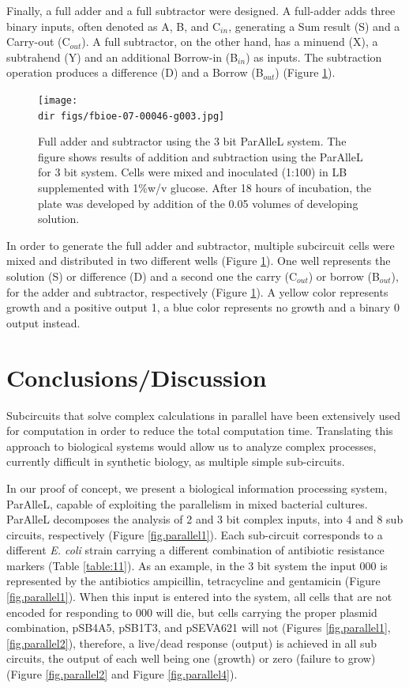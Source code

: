 Finally, a full adder and a full subtractor were designed. A full-adder adds three binary inputs, often denoted as A, B, and C$_{in}$, generating a Sum result (S) and a Carry-out (C$_{out}$). A full subtractor, on the other hand, has a minuend (X), a subtrahend (Y) and an additional Borrow-in (B$_{in}$) as inputs. The subtraction operation produces a difference (D) and a Borrow (B$_{out}$) (Figure \ref{fig.parallel3}).
\begin{figure}[htbp]
  \centering
  \texttt{[image: \\dir figs/fbioe-07-00046-g003.jpg]}
  \caption{Full adder and subtractor using the 3 bit ParAlleL system. The figure shows results of addition and subtraction using the ParAlleL for 3 bit system. Cells were mixed and inoculated (1:100) in LB supplemented with 1\%w/v glucose. After 18 hours of incubation, the plate was developed by addition of the 0.05 volumes of developing solution.}
  \label{fig.parallel3}
\end{figure}

In order to generate the full adder and subtractor, multiple subcircuit cells were mixed and distributed in two different wells (Figure \ref{fig.parallel3}). One well represents the solution (S) or difference (D) and a second one the carry (C$_{out}$) or borrow (B$_{out}$), for the adder and subtractor, respectively (Figure \ref{fig.parallel3}). A yellow color represents growth and a positive output 1, a blue color represents no growth and a binary 0 output instead.

\section{Conclusions/Discussion}

Subcircuits that solve complex calculations in parallel have been extensively used for computation in order to reduce the total computation time. Translating this approach to biological systems would allow us to analyze complex processes, currently difficult in synthetic biology, as multiple simple sub-circuits.

In our proof of concept, we present a biological information processing system, ParAlleL, capable of exploiting the parallelism in mixed bacterial cultures. ParAlleL decomposes the analysis of 2 and 3 bit complex inputs, into 4 and 8 sub circuits, respectively (Figure \ref{fig.parallel1}). Each sub-circuit corresponds to a different \textit{E. coli} strain carrying a different combination of antibiotic resistance markers (Table \ref{table:11}). As an example, in the 3 bit system the input 000 is represented by the antibiotics ampicillin, tetracycline and gentamicin (Figure \ref{fig.parallel1}). When this input is entered into the system, all cells that are not encoded for responding to 000 will die, but cells carrying the proper plasmid combination, pSB4A5, pSB1T3, and pSEVA621 will not (Figures \ref{fig.parallel1}, \ref{fig.parallel2}), therefore, a live/dead response (output) is achieved in all sub circuits, the output of each well being one (growth) or zero (failure to grow) (Figure \ref{fig.parallel2} and Figure \ref{fig.parallel4}).

